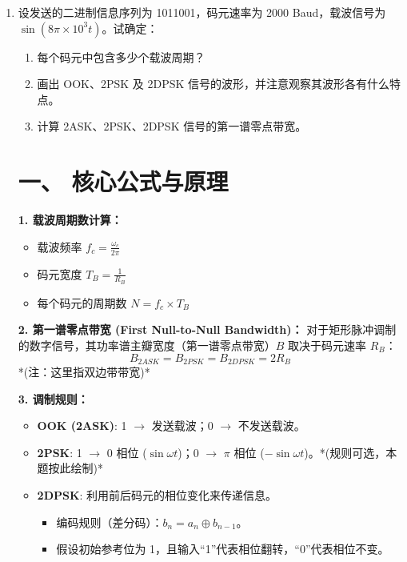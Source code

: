 \documentclass[a4paper,11pt]{ctexart}
\begin{document}
\begin{enumerate}[label=\textbf{7-\arabic*}]
    \item 设发送的二进制信息序列为 1011001，码元速率为 2000 Baud，载波信号为 $\sin(8\pi \times 10^3 t)$。试确定：
    \begin{enumerate}
        \item 每个码元中包含多少个载波周期？
        \item 画出 OOK、2PSK 及 2DPSK 信号的波形，并注意观察其波形各有什么特点。
        \item 计算 2ASK、2PSK、2DPSK 信号的第一谱零点带宽。
    \end{enumerate}
\begin{tcolorbox}[colback=white, colframe=blue!50!black, title=\textbf{题目解答：7-1 二进制数字调制系统分析}]

    \section*{一、 核心公式与原理}
    
    \textbf{1. 载波周期数计算：}
    \begin{itemize}
        \item 载波频率 $f_c = \frac{\omega_c}{2\pi}$
        \item 码元宽度 $T_B = \frac{1}{R_B}$
        \item 每个码元的周期数 $N = f_c \times T_B$
    \end{itemize}
    
    \textbf{2. 第一谱零点带宽 (First Null-to-Null Bandwidth)：}
    对于矩形脉冲调制的数字信号，其功率谱主瓣宽度（第一谱零点带宽）$B$ 取决于码元速率 $R_B$：
    \begin{equation}
        B_{2ASK} = B_{2PSK} = B_{2DPSK} = 2 R_B
    \end{equation}
    *(注：这里指双边带带宽)*
    
    \textbf{3. 调制规则：}
    \begin{itemize}
        \item \textbf{OOK (2ASK)}: 1 $\rightarrow$ 发送载波；0 $\rightarrow$ 不发送载波。
        \item \textbf{2PSK}: 1 $\rightarrow$ 0 相位 ($\sin \omega t$)；0 $\rightarrow$ $\pi$ 相位 ($-\sin \omega t$)。*(规则可选，本题按此绘制)*
        \item \textbf{2DPSK}: 利用前后码元的相位变化来传递信息。
            \begin{itemize}
                \item 编码规则（差分码）：$b_n = a_n \oplus b_{n-1}$。
                \item 假设初始参考位为 1，且输入“1”代表相位翻转，“0”代表相位不变。
            \end{itemize}
    \end{itemize}


\end{tcolorbox}
\end{enumerate}
\end{document}
